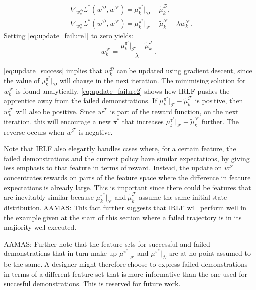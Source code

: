 \documentclass{aamas2016}
\newcommand{\sw}[1]{\textcolor{red}{SW: #1}}
\newcommand{\ks}[1]{\textcolor{dark_green}{Kyriacos: #1}}
\newcommand{\aama}[1]{\textcolor{dim_gray}{AAMAS: #1}}
\newcommand{\sw}[1]{}
\newcommand{\ks}[1]{}
\begin{document}
\begin{align}
	&\nabla_{w^{\mathcal{D}}_k}L^*(w^{\mathcal{D}},w^{\mathcal{F}}) = \mu^{\pi^*}_ k|_{\mathcal{D}}- \widetilde{\mu}^{\mathcal{D}}_k \label{eq:update_success},\\
		&\nabla_{w^{\mathcal{F}}_k}L^*(w^{\mathcal{D}},w^{\mathcal{F}}) = \mu^{\pi^*}_k|_{\mathcal{F}} - \widetilde{\mu}^{\mathcal{F}}_k - \lambda w^{\mathcal{F}}_k. \label{eq:update_failure1}
\end{align}
Setting \eqref{eq:update_failure1} to zero yields:
\begin{equation}
  \label{eq:update_failure2}
  w^{\mathcal{F}}_k = \frac{\mu^{\pi^*}_k|_{\mathcal{F}} - \widetilde{\mu}^{\mathcal{F}}_k}{\lambda}.
\end{equation}
%

\noindent \eqref{eq:update_success} implies that $w^{\mathcal{D}}_k$ can be updated using gradient descent, since the value of $\mu^{\pi^*}_ k|_{\mathcal{D}}$ will change in the next iteration.
The minimising solution for $w^{\mathcal{F}}_k$ is found analytically.
\eqref{eq:update_failure2} shows how IRLF pushes the apprentice away from the failed demonstrations.  If $\mu^{\pi^*}_k|_{\mathcal{F}} - \widetilde{\mu}^{\mathcal{F}}_k$ is positive, then $w^{\mathcal{F}}_k$ will also be positive.  Since $w^{\mathcal{F}}$ is part of the reward function, on the next iteration, this will encourage a new $\pi^*$ that increases $\mu^{\pi^*}_k|_{\mathcal{F}} - \widetilde{\mu}^{\mathcal{F}}_k$ further.  The reverse occurs when $w^{\mathcal{F}}$ is negative.

Note that IRLF also elegantly handles cases where, for a certain feature, the failed demonstrations and the current policy have similar expectations, by giving less emphasis to that feature in terms of reward. Instead, the update on $w^{\mathcal{F}}$ concentrates rewards on parts of the feature space where the difference in feature expectations is already large. This is important since there could be features that are inevitably similar because $\mu^{\pi^*}_k|_{\mathcal{F}}$ 
and $\widetilde{\mu}^{\mathcal{F}}_k$ assume the same initial state distribution. \aama{This fact further suggests that IRLF will perform well in the example given at the start of this section where a failed trajectory is in its majiority well executed.} 

\aama{Further note that the feature sets for successful and failed demonstrations that in turn make up $ \mu^{\pi^*}|_{\mathcal{F}}$ and $ \mu^{\pi^*}|_{\mathcal{D}}$  are at no point assumed to be the same. A designer might therefore choose to express failed demonstrations in terms of a different feature set that is more informative than the one used for succesful demonstrations. This is reserved for future work.}
\end{document}
